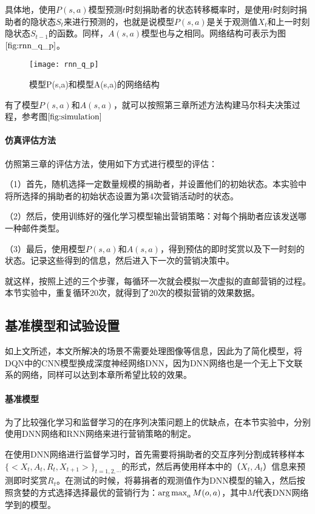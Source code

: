 具体地，使用$P(s,a)$模型预测$t$时刻捐助者的状态转移概率时，是使用$t$时刻时捐助者的隐状态$S_{t}$来进行预测的，也就是说模型$P(s,a)$是关于观测值$X_{t}$和上一时刻隐状态$S_{t-1}$的函数。同样，$A(s,a)$模型也与之相同。网络结构可表示为图$\ref{fig:rnn_q_p}$。

\begin{figure}[htbp]
\centering
\texttt{[image: rnn\_q\_p]}
\caption{模型P(s,a)和模型A(s,a)的网络结构}
\label{fig:rnn_q_p}
\end{figure}

有了模型$P(s,a)$和$A(s,a)$，就可以按照第三章所述方法构建马尔科夫决策过程，参考图$\ref{fig:simulation}$

\paragraph{仿真评估方法}
仿照第三章的评估方法，使用如下方式进行模型的评估：

（1）首先，随机选择一定数量规模的捐助者，并设置他们的初始状态。本实验中将所选择的捐助者的初始状态设置为第4次营销活动时的状态。

（2）然后，使用训练好的强化学习模型输出营销策略：对每个捐助者应该发送哪一种邮件类型。

（3）最后，使用模型$P(s,a)$和$A(s,a)$，得到预估的即时奖赏以及下一时刻的状态。记录这些得到的信息，然后进入下一次的营销决策中。

就这样，按照上述的三个步骤，每循环一次就会模拟一次虚拟的直邮营销的过程。本节实验中，重复循环20次，就得到了20次的模拟营销的效果数据。


\subsection{基准模型和试验设置}
如上文所述，本文所解决的场景不需要处理图像等信息，因此为了简化模型，将DQN中的CNN模型换成深度神经网络DNN，因为DNN网络也是一个无上下文联系的网络，同样可以达到本章所希望比较的效果。

\paragraph{基准模型}
为了比较强化学习和监督学习的在序列决策问题上的优缺点，在本节实验中，分别使用DNN网络和RNN网络来进行营销策略的制定。

在使用DNN网络进行监督学习时，首先需要将捐助者的交互序列分割成转移样本$\{<X_{t},A_{t},R_{t},X_{t+1}>\}_{t=1,2,\cdots}$的形式，然后再使用样本中的（$X_{t},A_{t}$）信息来预测即时奖赏$R_{t}$。在测试的时候，将募捐者的观测值作为DNN模型的输入，然后按照贪婪的方式选择选择最优的营销行为：$\operatorname*{arg\,max}_{a} M(o,a)$，其中$M$代表DNN网络学到的模型。

